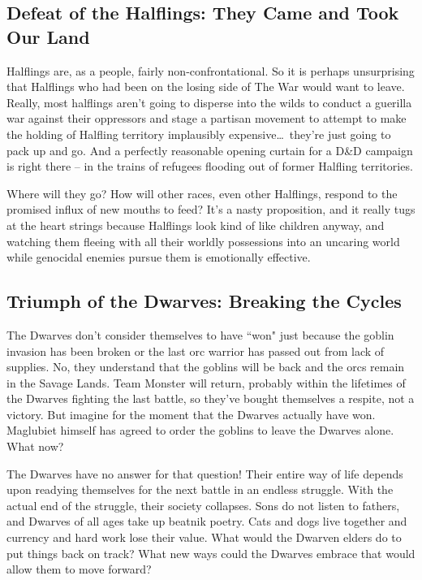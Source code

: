 \subsection{Defeat of the Halflings: They Came and Took Our Land}

Halflings are, as a people, fairly non-confrontational. So it is perhaps unsurprising that Halflings who had been on the losing side of The War would want to leave. Really, most halflings aren't going to disperse into the wilds to conduct a guerilla war against their oppressors and stage a partisan movement to attempt to make the holding of Halfling territory implausibly expensive\ldots\  they're just going to pack up and go. And a perfectly reasonable opening curtain for a D\&D campaign is right there -- in the trains of refugees flooding out of former Halfling territories.

Where will they go? How will other races, even other Halflings, respond to the promised influx of new mouths to feed? It's a nasty proposition, and it really tugs at the heart strings because Halflings look kind of like children anyway, and watching them fleeing with all their worldly possessions into an uncaring world while genocidal enemies pursue them is emotionally effective.

\subsection{Triumph of the Dwarves: Breaking the Cycles}

The Dwarves don't consider themselves to have ``won" just because the goblin invasion has been broken or the last orc warrior has passed out from lack of supplies. No, they understand that the goblins will be back and the orcs remain in the Savage Lands. Team Monster will return, probably within the lifetimes of the Dwarves fighting the last battle, so they've bought themselves a respite, not a victory. But imagine for the moment that the Dwarves actually have won. Maglubiet himself has agreed to order the goblins to leave the Dwarves alone. What now?

The Dwarves have no answer for that question! Their entire way of life depends upon readying themselves for the next battle in an endless struggle. With the actual end of the struggle, their society collapses. Sons do not listen to fathers, and Dwarves of all ages take up beatnik poetry. Cats and dogs live together and currency and hard work lose their value. What would the Dwarven elders do to put things back on track? What new ways could the Dwarves embrace that would allow them to move forward?

